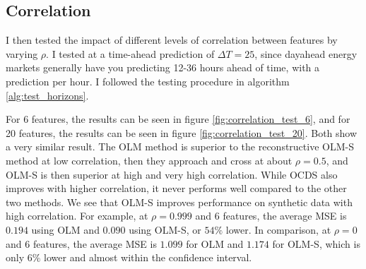 \subsection{Correlation}

I then tested the impact of different levels of correlation between features by
varying $\rho$. I tested at a time-ahead prediction of $\Delta T = 25$, since
dayahead energy markets generally have you predicting 12-36 hours ahead of
time, with a prediction per hour. I followed the testing procedure in algorithm
\ref{alg:test_horizons}.

For 6 features, the results can be seen in figure \ref{fig:correlation_test_6},
and for 20 features, the results can be seen in figure
\ref{fig:correlation_test_20}. Both show a very similar result. The OLM method
is superior to the reconstructive OLM-S method at low correlation, then they
approach and cross at about $\rho=0.5$, and OLM-S is then superior at high and
very high correlation. While OCDS also improves with higher correlation, it
never performs well compared to the other two methods. We see that OLM-S
improves performance on synthetic data with high correlation. For example, at
$\rho=0.999$ and 6 features, the average MSE is $0.194$ using OLM and $0.090$
using OLM-S, or $54\%$ lower. In comparison, at $\rho = 0$ and 6 features, the
average MSE is $1.099$ for OLM and $1.174$ for OLM-S, which is only $6\%$
lower and almost within the confidence interval.



